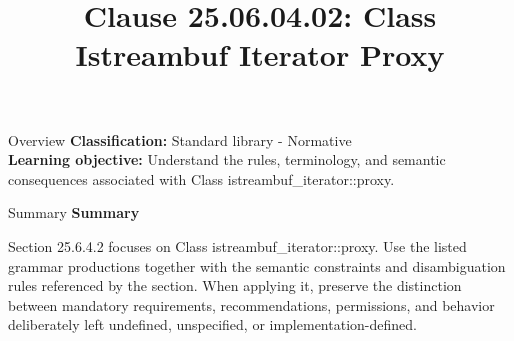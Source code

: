 \documentclass[10pt,letterpaper]{article}
\title{Clause 25.06.04.02: Class Istreambuf Iterator Proxy}
\author{}
\date{}
\begin{document}
\maketitle
\begin{CornellOverviewBox}{Overview}
\textbf{Classification:} Standard library - Normative\\[2pt]
\textbf{Learning objective:} Understand the rules, terminology, and semantic consequences associated with Class istreambuf\_iterator::proxy.
\end{CornellOverviewBox}\begin{CornellSummaryBox}{Summary}
{\sffamily\bfseries\color{Accent} Summary}\par\vspace{3pt}Section 25.6.4.2 focuses on Class istreambuf\_iterator::proxy. Use the listed grammar productions together with the semantic constraints and disambiguation rules referenced by the section. When applying it, preserve the distinction between mandatory requirements, recommendations, permissions, and behavior deliberately left undefined, unspecified, or implementation-defined.
\end{CornellSummaryBox}
\end{document}

